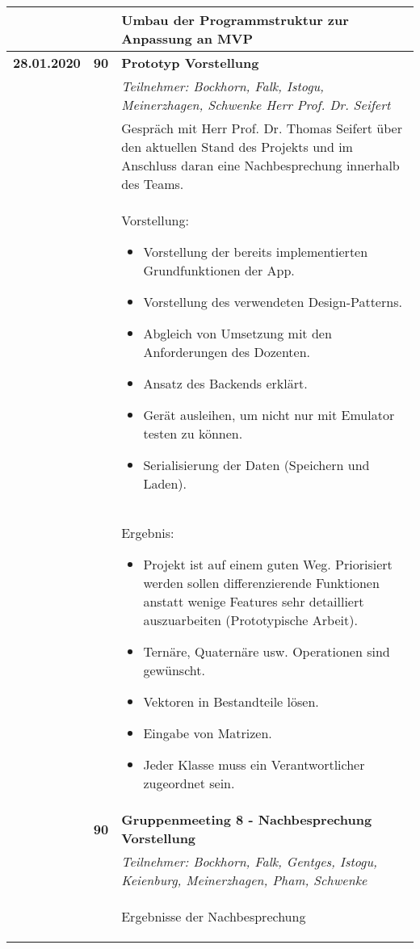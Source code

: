 {\begin{longtable}{|l|l|p{11cm}|}
			\\ & &
			Umbau der Programmstruktur zur Anpassung an MVP
	\\ \hline
		\textbf{28.01.2020} 
			& \textbf{\hfill90} & \textbf{Prototyp Vorstellung}
			\\ & &
			\small{\textit{Teilnehmer: Bockhorn, Falk, Istogu, Meinerzhagen, Schwenke Herr Prof. Dr. Seifert}}
			\\ & &
			Gespräch mit Herr Prof. Dr. Thomas Seifert über den aktuellen Stand des Projekts und im Anschluss daran eine Nachbesprechung innerhalb des Teams.
			\\ & &
			Vorstellung:
			\begin{itemize}\renewcommand\labelitemi{--}
				\item Vorstellung der bereits implementierten Grundfunktionen der App.
				\item Vorstellung des verwendeten Design-Patterns.
				\item Abgleich von Umsetzung mit den Anforderungen des Dozenten.
				\item Ansatz des Backends erklärt.
				\item Gerät ausleihen, um nicht nur mit Emulator testen zu können.
				\item Serialisierung der Daten (Speichern und Laden).
			\end{itemize}
			\\ & &
			Ergebnis:
			\begin{itemize}\renewcommand\labelitemi{--}
				\item Projekt ist auf einem guten Weg. Priorisiert werden sollen differenzierende Funktionen anstatt wenige Features sehr detailliert auszuarbeiten (Prototypische Arbeit).
				\item Ternäre, Quaternäre usw. Operationen sind gewünscht.
				\item Vektoren in Bestandteile lösen.
				\item Eingabe von Matrizen.
				\item Jeder Klasse muss ein Verantwortlicher zugeordnet sein.
			\end{itemize}		
		\\ \cline{2-3}
		& \textbf{\hfill90} & \textbf{Gruppenmeeting 8 - Nachbesprechung Vorstellung}
			\\ & &
			\small{\textit{Teilnehmer: Bockhorn, Falk, Gentges, Istogu, Keienburg, Meinerzhagen, Pham, Schwenke}}
			\\ & &
			Ergebnisse der Nachbesprechung
			\begin{itemize}\renewcommand\labelitemi{--}

\end{itemize}
\end{longtable}}
